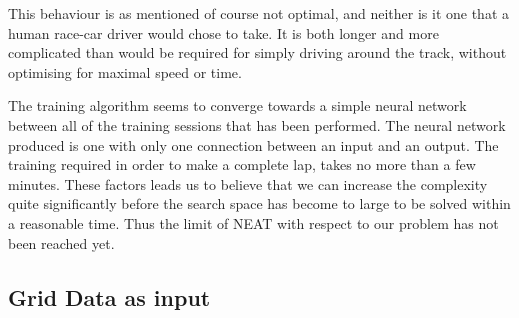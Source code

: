 This behaviour is as mentioned of course not optimal, and neither is it one that a human race-car driver would chose to take. It is both longer and more complicated than would be required for simply driving around the track, without optimising for maximal speed or time.

The training algorithm seems to converge towards a simple neural network between all of the training sessions that has been performed. The neural network produced is one with only one connection between an input and an output. The training required in order to make a complete lap, takes no more than a few minutes. These factors leads us to believe that we can increase the complexity quite significantly before the search space has become to large to be solved within a reasonable time. Thus the limit of NEAT with respect to our problem has not been reached yet.


\subsection{Grid Data as input}

\iffalse
General structure for the results of an experiment:
- Shortly describe the experiment and reference to the description in Method
- Result data (See below)
- Stages in the learning development
  - Did it get stuck at some point?
- What the behaviour became
  - Description
  - Image with interesting racing lines
- Analyse
- Compare to other experiments (if feasible)

Result data:
- Training time
 - Number of generations etc.
 - Number of evaluations
- Fitness
- Analysis of behaviour, may be of different aspects
- Settings variables
- Topology of network
 - measurements of different kinds?

\fi